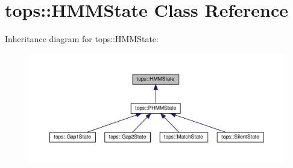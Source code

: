 \hypertarget{classtops_1_1HMMState}{}\section{tops\+:\+:H\+M\+M\+State Class Reference}
\label{classtops_1_1HMMState}


Inheritance diagram for tops\+:\+:H\+M\+M\+State\+:
\nopagebreak
\begin{figure}[H]
\begin{center}
\leavevmode
\includegraphics[width=350pt]{classtops_1_1HMMState__inherit__graph}
\end{center}
\end{figure}
